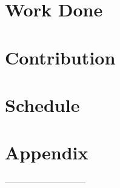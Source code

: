 \documentclass[12pt]{article}
\begin{document}
\section{Work Done}
\label{workDone}


\section{Contribution}
\label{contribution}


\section{Schedule}
\label{schedule}


\clearpage
\newpage



\clearpage
\newpage

\section{Appendix}
\label{appendix}

 
  -----------------------------
\end{document}
